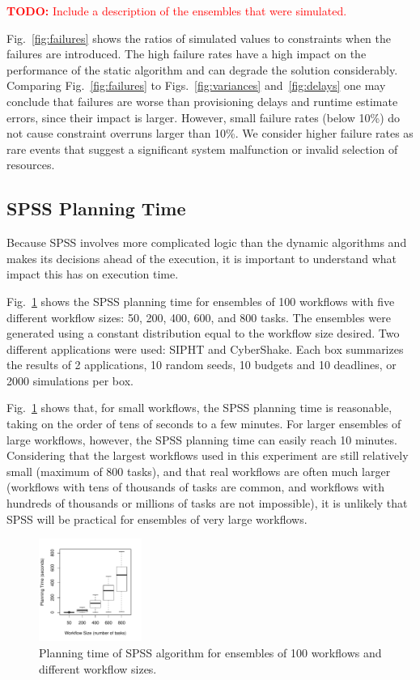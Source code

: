 \documentclass[conference]{IEEEtran}
\newcommand{\TODO}[1]{
  {\Large \textcolor{red}{\textbf{TODO: }#1}}
}
\begin{document}
\TODO{Include a description of the ensembles that were simulated.}

Fig.~\ref{fig:failures} shows the ratios of simulated values to constraints when
the failures are introduced. The high failure rates have a high impact on the
performance of the static algorithm and can degrade the solution considerably.
Comparing Fig.~\ref{fig:failures} to Figs.~\ref{fig:variances}
and~\ref{fig:delays} one may conclude that failures are worse than
provisioning delays and runtime estimate errors, since their impact is larger.
However, small failure rates (below 10\%) do not cause constraint overruns
larger than 10\%. We consider higher failure rates as rare events that suggest
a significant system malfunction or invalid selection of resources.


\subsection{SPSS Planning Time}

 Because SPSS involves more complicated
logic than the dynamic algorithms and makes its decisions ahead of the execution, it is important to understand what impact
this has on execution time.

Fig.~\ref{fig:spss_planning_time} shows the SPSS planning time for ensembles
of 100 workflows with five different workflow sizes: 50, 200, 400, 600, and
800 tasks. The ensembles were generated using a constant distribution equal to
the workflow size desired. Two different applications were used: SIPHT and
CyberShake. Each box summarizes the results of 2 applications, 10 random
seeds, 10 budgets and 10 deadlines, or 2000 simulations per box.

Fig.~\ref{fig:spss_planning_time} shows that, for small workflows, the SPSS
planning time is reasonable, taking on the order of tens of seconds to a few
minutes. For larger ensembles of large workflows, however, the SPSS planning
time can easily reach 10 minutes. Considering that the largest workflows used
in this experiment are still relatively small (maximum of 800 tasks), and that
real workflows are often much larger (workflows with tens of thousands of
tasks are common, and workflows with hundreds of thousands or millions of
tasks are not impossible), it is unlikely that SPSS will be practical for
ensembles of very large workflows.

\begin{figure}[tb]
    \centering
    \includegraphics[width=0.3\textwidth]{spss_planning_time}
    \caption{Planning time of SPSS algorithm for ensembles of 100 workflows and different workflow sizes.}
    \label{fig:spss_planning_time}
\end{figure}
\end{document}
